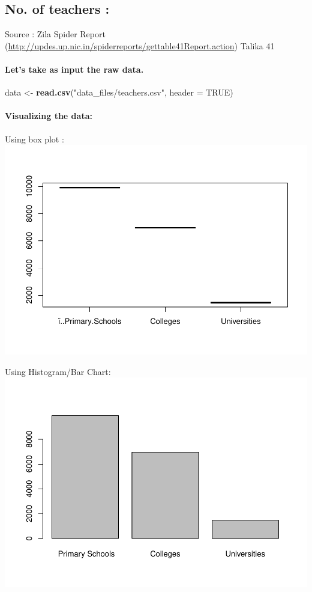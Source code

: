 \documentclass[]{article}
\newenvironment{Shaded}{\begin{snugshade}}{\end{snugshade}}
\newcommand{\KeywordTok}[1]{\textcolor[rgb]{0.13,0.29,0.53}{\textbf{#1}}}
\newcommand{\DataTypeTok}[1]{\textcolor[rgb]{0.13,0.29,0.53}{#1}}
\newcommand{\StringTok}[1]{\textcolor[rgb]{0.31,0.60,0.02}{#1}}
\newcommand{\OtherTok}[1]{\textcolor[rgb]{0.56,0.35,0.01}{#1}}
\newcommand{\NormalTok}[1]{#1}
\let\oldparagraph\paragraph
\renewcommand{\paragraph}[1]{\oldparagraph{#1}\mbox{}}
\begin{document}
\subsection{No. of teachers :}\label{no.-of-teachers}

Source : Zila Spider Report
(\url{http://updes.up.nic.in/spiderreports/gettable41Report.action})
Talika 41

\paragraph{Let's take as input the raw
data.}\label{lets-take-as-input-the-raw-data.-5}

\begin{Shaded}
\begin{Highlighting}[]
\NormalTok{data <-}\StringTok{ }\KeywordTok{read.csv}\NormalTok{(}\StringTok{"data_files/teachers.csv"}\NormalTok{, }\DataTypeTok{header =} \OtherTok{TRUE}\NormalTok{)}
\end{Highlighting}
\end{Shaded}

\paragraph{Visualizing the data:}\label{visualizing-the-data-5}

Using box plot :
\includegraphics{Report_files/figure-latex/unnamed-chunk-22-1.pdf}

Using Histogram/Bar Chart:
\includegraphics{Report_files/figure-latex/unnamed-chunk-23-1.pdf}
\end{document}

